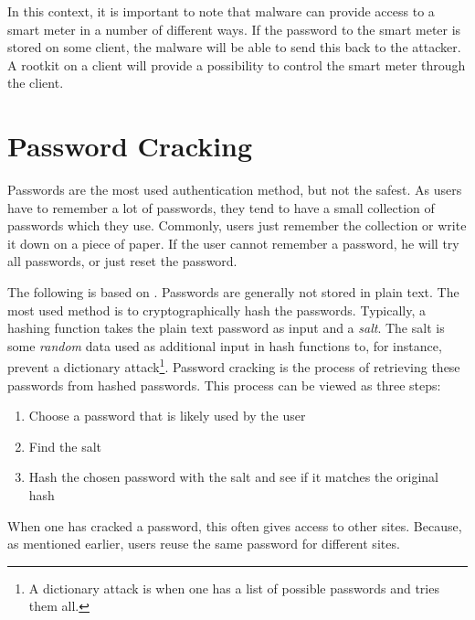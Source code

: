 In this context, it is important to note that malware can provide access to a smart meter in a number of different ways.
If the password to the smart meter is stored on some client, the malware will be able to send this back to the attacker.
A rootkit on a client will provide a possibility to control the smart meter through the client.

\section{Password Cracking}\label{password_cracking}
Passwords are the most used authentication method, but not the safest.
As users have to remember a lot of passwords, they tend to have a small collection of passwords which they use.
Commonly, users just remember the collection or write it down on a piece of paper.
If the user cannot remember a password, he will try all passwords, or just reset the password.\cite{florencio2007large,bishop1995improving,dell2010password}

The following is based on \citet{marechal2008advances}.
Passwords are generally not stored in plain text.
The most used method is to cryptographically hash the passwords.
Typically, a hashing function takes the plain text password as input and a \emph{salt}.
The salt is some \textit{random} data used as additional input in hash functions to, for instance, prevent a dictionary attack\footnote{A dictionary attack is when one has a list of possible passwords and tries them all.}.
Password cracking is the process of retrieving these passwords from hashed passwords.
This process can be viewed as three steps:
\begin{enumerate}
\item Choose a password that is likely used by the user
\item Find the salt
\item Hash the chosen password with the salt and see if it matches the original hash
\end{enumerate}

When one has cracked a password, this often gives access to other sites.
Because, as mentioned earlier, users reuse the same password for different sites.

